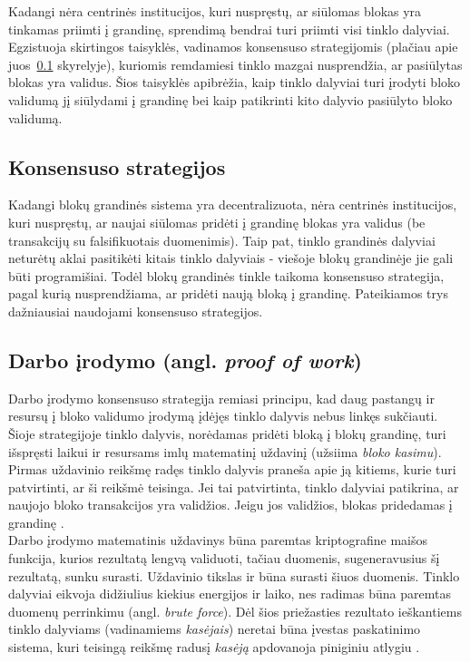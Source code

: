 Kadangi nėra centrinės institucijos, kuri nuspręstų, ar siūlomas blokas yra tinkamas priimti į grandinę, sprendimą bendrai turi priimti
visi tinklo dalyviai. Egzistuoja skirtingos taisyklės, vadinamos konsensuso strategijomis (plačiau apie juos~\ref{blockchain:consensus} skyrelyje), kuriomis
remdamiesi tinklo mazgai nusprendžia, ar pasiūlytas blokas yra validus. Šios taisyklės apibrėžia, kaip tinklo dalyviai turi įrodyti bloko validumą jį siūlydami į grandinę
bei kaip patikrinti kito dalyvio pasiūlyto bloko validumą.

\subsection{Konsensuso strategijos} \label{blockchain:consensus}

Kadangi blokų grandinės sistema yra decentralizuota, nėra centrinės institucijos, kuri nuspręstų, ar naujai siūlomas pridėti į grandinę blokas
yra validus (be transakcijų su falsifikuotais duomenimis). Taip pat, tinklo grandinės dalyviai neturėtų aklai pasitikėti kitais tinklo dalyviais - 
viešoje blokų grandinėje jie gali būti programišiai. Todėl blokų grandinės tinkle taikoma konsensuso strategija,
pagal kurią nusprendžiama, ar pridėti naują bloką į grandinę. Pateikiamos trys dažniausiai naudojami konsensuso strategijos.

\subsection{Darbo įrodymo (angl. \textit{proof of work})}

Darbo įrodymo konsensuso strategija remiasi principu, kad daug pastangų ir resursų į bloko validumo įrodymą įdėjęs tinklo
dalyvis nebus linkęs sukčiauti. Šioje strategijoje tinklo dalyvis, norėdamas pridėti bloką į blokų grandinę, turi išspręsti laikui ir resursams
imlų matematinį
uždavinį (užsiima \textit{bloko kasimu}). Pirmas uždavinio reikšmę radęs tinklo dalyvis praneša apie ją kitiems, kurie turi patvirtinti,
ar ši reikšmė teisinga. Jei tai patvirtinta, tinklo dalyviai patikrina, ar naujojo bloko transakcijos yra validžios. Jeigu jos validžios,
blokas pridedamas į grandinę \cite{Zheng2017}.\\
Darbo įrodymo matematinis uždavinys būna paremtas kriptografine maišos funkcija, kurios rezultatą lengvą validuoti,
tačiau duomenis, sugeneravusius šį rezultatą, sunku surasti. Uždavinio tikslas ir būna surasti šiuos duomenis. Tinklo dalyviai eikvoja didžiulius kiekius energijos ir laiko,
nes radimas būna paremtas duomenų perrinkimu (angl. \textit{brute force}). Dėl šios priežasties rezultato ieškantiems tinklo dalyviams
(vadinamiems \textit{kasėjais}) neretai būna įvestas paskatinimo sistema, kuri teisingą reikšmę radusį
\textit{kasėją} apdovanoja piniginiu atlygiu \cite{SatoshiNakamoto}. 

